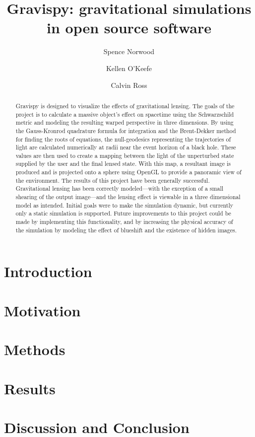 \documentclass[
aps,prd,
preprint,
onecolumn,
12pt,
amsmath, amssymb,
secnumarabic,
]{revtex4-1}
\begin{document}
\title{Gravispy: gravitational simulations in open source software}
\author{Spence Norwood}
\author{Kellen O'Keefe}
\author{Calvin Ross}
\begin{abstract}
Gravispy is designed to visualize the effects of gravitational lensing.
The goals of the project is to calculate a massive object's effect on spacetime using the Schwarzschild metric and modeling the resulting warped perspective in three dimensions.
By using the Gauss-Kronrod quadrature formula for integration and the Brent-Dekker method for finding the roots of equations, the null-geodesics representing the trajectories of light are calculated numerically at radii near the event horizon of a black hole.
These values are then used to create a mapping between the light of the unperturbed state supplied by the user and the final lensed state.
With this map, a resultant image is produced and is projected onto a sphere using OpenGL to provide a panoramic view of the environment.
The results of this project have been generally successful.
Gravitational lensing has been correctly modeled---with the exception of a small shearing of the output image---and the lensing effect is viewable in a three dimensional model as intended.
Initial goals were to make the simulation dynamic, but currently only a static simulation is supported.
Future improvements to this project could be made by implementing this functionality, and by increasing the physical accuracy of the simulation by modeling the effect of blueshift and the existence of hidden images.
\end{abstract}
\maketitle

\section{Introduction\label{sec:intro}}


\section{Motivation\label{sec:motive}}


\section{Methods\label{sec:method}}


\section{Results\label{sec:results}}


\section{Discussion and Conclusion}


\nocite{*}

\end{document}
